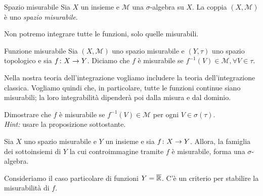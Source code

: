 \documentclass[a4paper]{article}
\begin{document}
\begin{radioactive}
\begin{snippetdefinition}{Spazio misurabile}
    Sia \(X\) un insieme e \(\mathcal M\) una \(\sigma\)-algebra su \(X\).
    La coppia \((X, \mathcal M)\) è uno \emph{spazio misurabile}.
\end{snippetdefinition}
\end{radioactive}

\begin{radioactive}
Non potremo integrare tutte le funzioni, solo quelle misurabili.
\end{radioactive}

\begin{radioactive}
\begin{snippetdefinition}{Funzione misurabile}
    Sia \((X, \mathcal M)\) uno spazio misurabile e \((Y, \tau)\)
    uno spazio topologico e sia \(f \colon X \to Y\).
    Diciamo che \(f\) è misurabile se \(f^{-1}(V) \in \mathcal M, \forall V \in \tau\).
\end{snippetdefinition}
\end{radioactive}

\begin{radioactive}
Nella nostra teoria dell'integrazione vogliamo includere la teoria dell'integrazione classica.
Vogliamo quindi che, in particolare, tutte le funzioni continue siano misurabili; la loro integrabilità dipenderà poi dalla misura e dal dominio.
\end{radioactive}

\begin{radioactive}
\begin{snippetexercise}{}
    Dimostrare che \(f\) è misurabile se \(f^{-1}(V) \in \mathcal M\) per ogni \(V \in \sigma(\tau)\).  \\
    \emph{Hint:} usare la proposizione sottostante.
\end{snippetexercise}
\end{radioactive}

\begin{radioactive}
\begin{snippetproposition}{}
    Sia \(X\) uno spazio misurabile e \(Y\) un insieme e sia \(f \colon X \to Y\).
    Allora, la famiglia dei sottoinsiemi di \(Y\) la cui controimmagine tramite \(f\) è misurabile,
    forma una \(\sigma\)-algebra.
\end{snippetproposition}
\end{radioactive}

\begin{radioactive}
Consideriamo il caso particolare di funzioni \(Y=\overline {\mathbb{R}}\).
C'è un criterio per stabilire la misurabilità di \(f\).
\end{radioactive}
\end{document}
